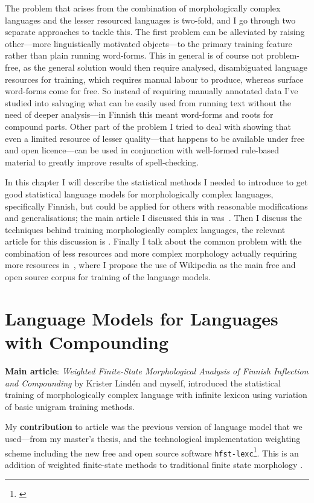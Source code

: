 \documentclass[officiallayout,draft]{unihelcompling}
\begin{document}
The problem that arises from the combination of morphologically complex 
languages and the lesser resourced languages is two-fold, and I go through two
separate approaches to tackle this. The first problem can be alleviated by
raising other---more linguistically motivated objects---to the primary training
feature rather than plain running word-forms. This in general is of course not
problem-free, as the general solution would then require analysed, 
disambiguated language resources for training, which requires manual labour to
produce, whereas surface word-forms come for free. So instead of requiring
manually annotated data I've studied into salvaging what can be easily used
from running text without the need of deeper analysis---in Finnish this meant
word-forms and roots for compound parts. Other part of the problem I tried to
deal with showing that even a limited resource of lesser quality---that
happens to be available under free and open licence---can be used
in conjunction with well-formed rule-based material to greatly improve results
of spell-checking.

In this chapter I will describe the statistical methods I needed to introduce
to get good statistical language models for morphologically complex languages,
specifically Finnish, but could be applied for others with reasonable
modifications and generalisations; the main article I discussed this in
was~\cite{pirinen2008nodalida}. Then I discuss the techniques behind training
morphologically complex languages, the relevant article for this discussion is
\cite{pirinen2008fsmnlp}. Finally I talk about the common problem with the
combination of less resources and more complex morphology actually requiring
more resources in~\cite{pirinen2008lrec}, where I propose the use of
Wikipedia as the main free and open source corpus for training of the
language models.

\section{Language Models for Languages with Compounding}

\textbf{Main article}: \emph{Weighted Finite-State Morphological Analysis of
Finnish Inflection and Compounding} \cite{pirinen2009nodalida} by Krister
Lindén and myself, introduced the statistical training of morphologically
complex language with infinite lexicon using variation of basic unigram
training methods.

My \textbf{contribution} to article was the previous version of language
model that we used---from my master's thesis, and the technological
implementation weighting scheme including the new free and open source software
\texttt{hfst-lexc}\footnote{\url{}}. This is an addition of weighted
finite-state methods to traditional finite state morphology 
\cite{beesley2003finite}. 
\end{document}
